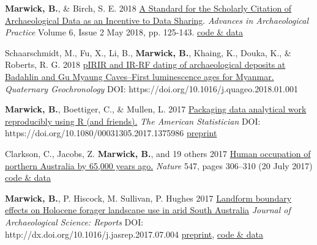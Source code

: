 \documentclass[11pt,article,oneside]{memoir}
\begin{document}
\ind \textbf{Marwick, B.}, \& Birch, S. E. 2018 \href{https://doi.org/10.1017/aap.2018.3}{A Standard for the Scholarly Citation of Archaeological Data as an Incentive to Data Sharing}.  \textit{Advances in Archaeological Practice} Volume 6, Issue 2 May 2018, pp. 125-143. \href{https://doi.org/10.17605/OSF.IO/KSRUZ}{code \& data}

\ind Schaarschmidt, M., Fu, X., Li, B., \textbf{Marwick, B.}, Khaing, K., Douka, K., \& Roberts, R. G. 2018 \href{https://doi.org/10.1016/j.quageo.2018.01.001}{pIRIR and IR-RF dating of archaeological deposits at Badahlin and Gu Myaung Caves–First luminescence ages for Myanmar.} \textit{Quaternary Geochronology} DOI: https://doi.org/10.1016/j.quageo.2018.01.001

\ind \textbf{Marwick, B.}, Boettiger, C., \& Mullen, L. 2017 \href{https://doi.org/10.1080/00031305.2017.1375986}{Packaging data analytical work reproducibly using R (and friends).} \textit{The American Statistician} \newline DOI: https://doi.org/10.1080/00031305.2017.1375986 \href{https://doi.org/10.7287/peerj.preprints.3192v1}{preprint}

\ind  Clarkson, C., Jacobs, Z. \textbf{Marwick, B.}, and 19 others 2017 \href{http://dx.doi.org/10.1038/nature22968}{Human occupation of northern Australia by 65,000 years ago.} \textit{Nature} 547, pages 306–310 (20 July 2017) \href{https://doi.org/10.17605/OSF.IO/QWFCZ}{code \& data}

\ind  \textbf{Marwick, B.}, P. Hiscock, M. Sullivan, P. Hughes 2017 \href{http://dx.doi.org/10.1016/j.jasrep.2017.07.004}{Landform boundary effects on Holocene forager landscape use in arid South Australia} \textit{Journal of Archaeological Science: Reports} DOI: http://dx.doi.org/10.1016/j.jasrep.2017.07.004 \href{https://doi.org/10.17605/OSF.IO/V2MS9}{preprint}, \href{https://doi.org/10.17605/OSF.IO/EDZXS}{code \& data}
\end{document}

